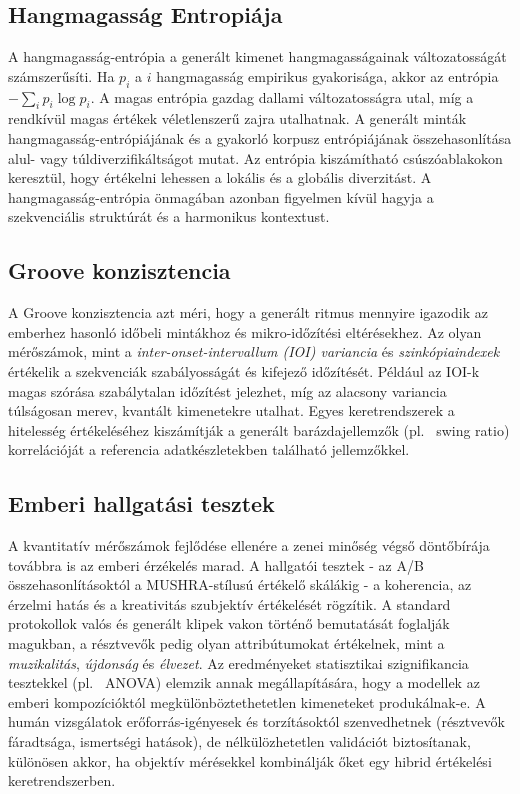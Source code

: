 \subsection{Hangmagasság Entropiája}
A hangmagasság-entrópia a generált kimenet hangmagasságainak változatosságát számszerűsíti.  Ha $p_i$ a $i$ hangmagasság empirikus gyakorisága, akkor az entrópia $-\sum_i p_i\log p_i$.  
A magas entrópia gazdag dallami változatosságra utal, míg a rendkívül magas értékek véletlenszerű zajra utalhatnak.  A generált minták hangmagasság-entrópiájának és a gyakorló korpusz entrópiájának összehasonlítása alul- vagy túldiverzifikáltságot mutat.  Az entrópia kiszámítható csúszóablakokon keresztül, hogy értékelni lehessen a lokális és a globális diverzitást.  A hangmagasság-entrópia önmagában azonban figyelmen kívül hagyja a szekvenciális struktúrát és a harmonikus kontextust.

\subsection{Groove konzisztencia}
A Groove konzisztencia azt méri, hogy a generált ritmus mennyire igazodik az emberhez hasonló időbeli mintákhoz és mikro-időzítési eltérésekhez.  Az olyan mérőszámok, mint a \emph{inter-onset-intervallum (IOI) variancia} és \emph{szinkópiaindexek} értékelik a szekvenciák szabályosságát és kifejező időzítését.  
Például az IOI-k magas szórása szabálytalan időzítést jelezhet, míg az alacsony variancia túlságosan merev, kvantált kimenetekre utalhat.  Egyes keretrendszerek a hitelesség értékeléséhez kiszámítják a generált barázdajellemzők (pl. \ swing ratio) korrelációját a referencia adatkészletekben található jellemzőkkel.

\subsection{Emberi hallgatási tesztek}
A kvantitatív mérőszámok fejlődése ellenére a zenei minőség végső döntőbírája továbbra is az emberi érzékelés marad.  A hallgatói tesztek - az A/B összehasonlításoktól a MUSHRA-stílusú értékelő skálákig - a koherencia, az érzelmi hatás és a kreativitás szubjektív értékelését rögzítik.  
A standard protokollok valós és generált klipek vakon történő bemutatását foglalják magukban, a résztvevők pedig olyan attribútumokat értékelnek, mint a \emph{muzikalitás}, \emph{újdonság} és \emph{élvezet}.  Az eredményeket statisztikai szignifikancia tesztekkel (pl. \ ANOVA) elemzik annak megállapítására, hogy a modellek az emberi kompozícióktól megkülönböztethetetlen kimeneteket produkálnak-e.  
A humán vizsgálatok erőforrás-igényesek és torzításoktól szenvedhetnek (résztvevők fáradtsága, ismertségi hatások), de nélkülözhetetlen validációt biztosítanak, különösen akkor, ha objektív mérésekkel kombinálják őket egy hibrid értékelési keretrendszerben.

